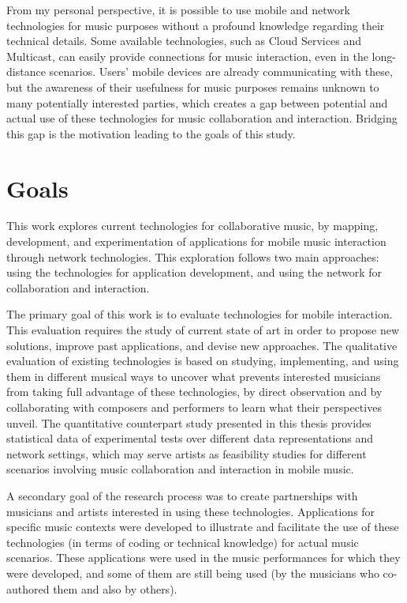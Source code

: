 From my personal perspective, it is possible to use mobile and network technologies for music purposes without a profound knowledge regarding their technical details. 
Some available technologies, such as Cloud Services and Multicast, can easily provide connections for music interaction, even in the long-distance scenarios. 
Users' mobile devices are already communicating with these, but the awareness of their usefulness for music purposes remains unknown to many potentially interested parties, which creates a gap between potential and actual use of these technologies for music collaboration and interaction. 
Bridging this gap is the motivation leading to the goals of this study.

\section{Goals}

This work explores current technologies for collaborative music, by mapping, development, and experimentation of applications for mobile music interaction through network technologies.
This exploration follows two main approaches: using the technologies for application development, and using the network for collaboration and interaction.

The primary goal of this work is to evaluate technologies for mobile interaction.
This evaluation requires the study of current state of art in order to propose new solutions, improve past applications, and devise new approaches.
The qualitative evaluation of existing technologies is based on studying, implementing, and using them in different musical ways to uncover what prevents interested musicians from taking full advantage of these technologies, by direct observation and by collaborating with composers and performers to learn what their perspectives unveil.
The quantitative counterpart study presented in this thesis provides statistical data of experimental tests over different data representations and network settings, which may serve artists as feasibility studies for different scenarios involving music collaboration and interaction in mobile music.

A secondary goal of the research process was to create partnerships with musicians and artists interested in using these technologies.
Applications for specific music contexts were developed to illustrate and facilitate the use of these technologies (in terms of coding or technical knowledge) for actual music scenarios.
These applications were used in the music performances for which they were developed, and some of them are still being used (by the musicians who co-authored them and also by others).

